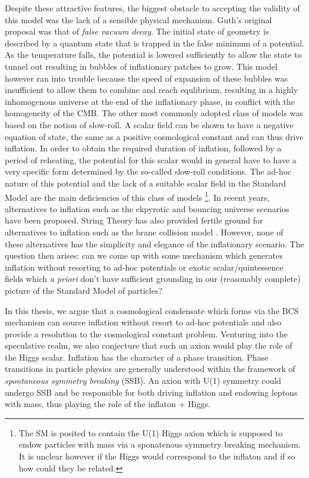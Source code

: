 \documentclass[11pt,english,rmp]{revtex4}
\begin{document}
Despite these attractive features, the biggest obstacle to accepting
the validity of this model was the lack of a sensible physical mechanism.
Guth's original proposal was that of \emph{false vacuum decay}. The
initial state of geometry is described by a quantum state that is
trapped in the false minimum of a potential. As the temperature falls,
the potential is lowered sufficiently to allow the state to tunnel
out resulting in bubbles of inflationary patches to grow. This model
however ran into trouble because the speed of expansion of these bubbles
was insufficient to allow them to combine and reach equlibrium, resulting
in a highly inhomogenous universe at the end of the inflationary phase,
in conflict with the homogeneity of the CMB. The other most commonly
adopted class of models was based on the notion of \textquotedbl{}slow-roll\textquotedbl{}.
A scalar field can be shown to have a negative equation of state,
the same as a positive cosmological constant and can thus drive inflation.
In order to obtain the required duration of inflation, followed by
a period of reheating, the potential for this scalar would in general
have to have a very specific form determined by the so-called \textquotedbl{}slow-roll\textquotedbl{}
conditions. The ad-hoc nature of this potential and the lack of a
suitable scalar field in the Standard Model are the main deficiencies
of this class of models%
\footnote{The SM is posited to contain the U(1) Higgs axion which is supposed
to endow particles with mass via a sponatenous symmetry breaking mechanism.
It is unclear however if the Higgs would correspond to the inflaton
and if so how could they be related.%
}. In recent years, alternatives to inflation such as the ekpyrotic
and bouncing universe scenarios have been proposed. String Theory
has also provided fertile ground for alternatives to inflation such
as the brane collision model \cite{Alexander2002Inflation}. However, none
of these alternatives has the simplicity and elegance of the inflationary
scenario. The question then arises: can we come up with some mechanism
which generates inflation without resorting to ad-hoc potentials or
exotic scalar/quintessence fields which \emph{a priori} don't have
sufficient grounding in our (reasonably complete) picture of the Standard
Model of particles?

In this thesis, we argue that a cosmological condensate which forms
via the BCS mechanism can source inflation without resort to ad-hoc
potentials and also provide a resolution to the cosmological constant
problem. Venturing into the speculative realm, we also conjecture
that such an axion would play the role of the Higgs scalar. Inflation
has the character of a phase transition. Phase transitions in particle
physics are generally understood within the framework of \emph{spontaneous
symmetry breaking} (SSB). An axion with U(1) symmetry could undergo
SSB and be responsible for both driving inflation and endowing leptons
with mass, thus playing the role of the inflaton + Higgs.
\end{document}
